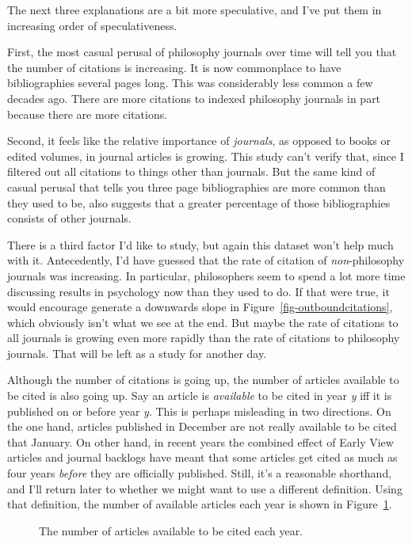 \documentclass[
  10pt,
  letterpaper,
  DIV=11,
  numbers=noendperiod,
  twoside]{scrartcl}
\makeatletter
\newcommand*\pandocbounded[1]{%
  \sbox\pandoc@box{#1}%
  \Gscale@div\@tempa{\textheight}{\dimexpr\ht\pandoc@box+\dp\pandoc@box\relax}%
  \Gscale@div\@tempb{\linewidth}{\wd\pandoc@box}%
  \ifdim\@tempb\p@<\@tempa\p@\let\@tempa\@tempb\fi%
  \ifdim\@tempa\p@<\p@\scalebox{\@tempa}{\usebox\pandoc@box}%
  \else\usebox{\pandoc@box}%
  \fi%
}
\makeatother
\begin{document}
The next three explanations are a bit more speculative, and I've put
them in increasing order of speculativeness.

First, the most casual perusal of philosophy journals over time will
tell you that the number of citations is increasing. It is now
commonplace to have bibliographies several pages long. This was
considerably less common a few decades ago. There are more citations to
indexed philosophy journals in part because there are more citations.

Second, it feels like the relative importance of \emph{journals}, as
opposed to books or edited volumes, in journal articles is growing. This
study can't verify that, since I filtered out all citations to things
other than journals. But the same kind of casual perusal that tells you
three page bibliographies are more common than they used to be, also
suggests that a greater percentage of those bibliographies consists of
other journals.

There is a third factor I'd like to study, but again this dataset won't
help much with it. Antecedently, I'd have guessed that the rate of
citation of \emph{non}-philosophy journals was increasing. In
particular, philosophers seem to spend a lot more time discussing
results in psychology now than they used to do. If that were true, it
would encourage generate a downwards slope in
Figure~\ref{fig-outboundcitations}, which obviously isn't what we see at
the end. But maybe the rate of citations to all journals is growing even
more rapidly than the rate of citations to philosophy journals. That
will be left as a study for another day.

Although the number of citations is going up, the number of articles
available to be cited is also going up. Say an article is
\emph{available} to be cited in year \emph{y} iff it is published on or
before year \emph{y}. This is perhaps misleading in two directions. On
the one hand, articles published in December are not really available to
be cited that January. On other hand, in recent years the combined
effect of Early View articles and journal backlogs have meant that some
articles get cited as much as four years \emph{before} they are
officially published. Still, it's a reasonable shorthand, and I'll
return later to whether we might want to use a different definition.
Using that definition, the number of available articles each year is
shown in Figure~\ref{fig-availablearticles}.

\begin{figure}

\centering{

\pandocbounded{\texttt{[image: apc\_files/figure-pdf/fig-availablearticles-1.pdf]}}

}

\caption{\label{fig-availablearticles}The number of articles available
to be cited each year.}

\end{figure}%
\end{document}
